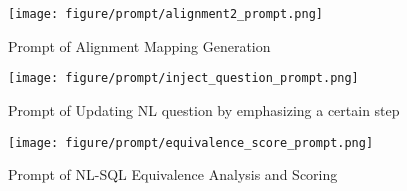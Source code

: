 \vspace*{\fill}
\begin{figure*}[ht]
  \centering
\texttt{[image: figure/prompt/alignment2\_prompt.png]}
  \caption{Prompt of Alignment Mapping Generation}
  \label{fig:prompt_alignment_map}
\end{figure*}
\vspace*{\fill}

\vspace*{\fill}
\begin{figure*}[ht]
  \centering
\texttt{[image: figure/prompt/inject\_question\_prompt.png]}
  \caption{Prompt of Updating NL question by emphasizing a certain step}
  \label{fig:prompt_inject}
\end{figure*}
\vspace*{\fill}

\vspace*{\fill}
\begin{figure*}[ht]
  \centering
\texttt{[image: figure/prompt/equivalence\_score\_prompt.png]}
  \caption{Prompt of NL-SQL Equivalence Analysis and Scoring}
  \label{fig:prompt_equivalence}
\end{figure*}
\vspace*{\fill}